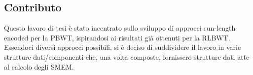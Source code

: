 \documentclass[a4paper,11pt, oneside,italian]{article}
\begin{document}
\subsection*{Contributo}


Questo lavoro di tesi è stato incentrato sullo sviluppo di approcci run-length
encoded per la PBWT, ispirandosi ai risultati già ottenuti per la RLBWT.
Essendoci diversi approcci
possibili,  si è deciso di suddividere il lavoro in varie strutture
dati/componenti che,
una volta composte, fornissero strutture dati atte al calcolo degli SMEM.
\end{document}

